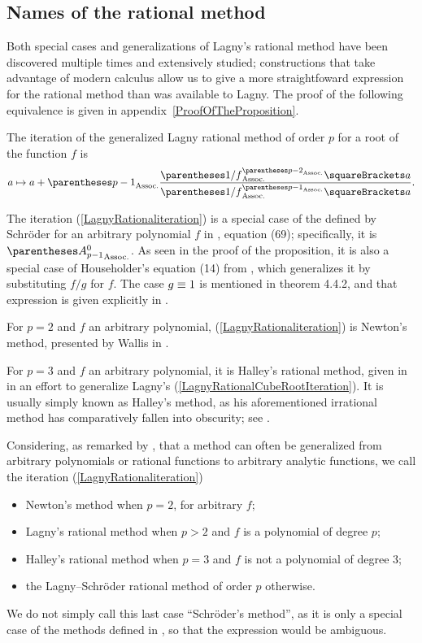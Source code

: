 ﻿\documentclass[10pt, a4paper, twoside]{basestyle}
\begin{document}
\subsection*{Names of the rational method}
Both special cases and generalizations of Lagny's rational method have been discovered multiple times
and extensively studied; constructions that take advantage of modern calculus allow us to give a more
straightfoward expression for the rational method than was available to Lagny.
The proof of the following equivalence is given in appendix~\ref{ProofOfTheProposition}.
\begin{proposition}
The iteration of the generalized Lagny rational method of order $p$ for a root of the
function $f$ is\begin{equation}
a\mapsto a + \pa{p-1}\frac{\pa{1/f}^{\pa{p-2}}\of{a}}{\pa{1/f}^{\pa{p-1}}\of{a}}\text.\label{LagnyRationaliteration}
\end{equation}
\end{proposition}
The iteration (\ref{LagnyRationaliteration}) is a special case of the  defined by Schröder for an
arbitrary polynomial $f$ in \cite[349\psq]{Schröder1870}, equation (69); specifically, it is $\pa{A^0_{p-1}}$.
As seen in the proof of the proposition, it is also a special case of Householder’s  equation (14) from \cite[169]{Householder1970}, which generalizes it by substituting $f/g$ for $f$. The case
$g\equiv1$ is mentioned in theorem 4.4.2, and that expression is given explicitly in \cite{SebahGourdon2001}.

For $p=2$ and $f$ an arbitrary polynomial, (\ref{LagnyRationaliteration}) is Newton's method, presented by Wallis in
\cite[338]{Wallis1685}.

For $p=3$ and $f$ an arbitrary polynomial, it is Halley's rational method, given in \cite[142--143]{Halley1694} in
an effort to generalize Lagny's (\ref{LagnyRationalCubeRootIteration}).
It is usually simply known as Halley's method, as his aforementioned irrational method has comparatively fallen into obscurity; see \cite{ScavoThoo1995}.

Considering, as remarked by \cite[334]{Schröder1870}, that a method can often
be generalized from arbitrary polynomials or rational functions to arbitrary
analytic functions, we call the iteration (\ref{LagnyRationaliteration})
\nowidow[1]  %
\begin{itemize}[nosep]
\item Newton’s method when $p=2$, for arbitrary $f$;
\item Lagny’s rational method when $p>2$ and $f$ is a polynomial of degree $p$;
\item Halley’s rational method when $p=3$ and $f$ is not a polynomial of degree $3$;
\item the Lagny--Schröder rational method of order $p$ otherwise.
\end{itemize}
We do not simply call this last case ``Schröder’s method'', as it is only a special case of the methods
defined in \cite{Schröder1870}, so that the expression would be ambiguous. 
\end{document}
